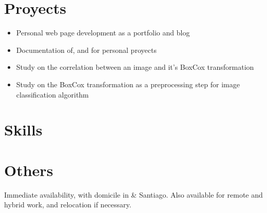 \documentclass{my_cv}
\begin{document}



\section{Proyects \faCogs}
\begin{itemize}
\item Personal web page development as a portfolio and blog
\item Documentation of, and for personal proyects
\end{itemize}

\begin{itemize}
\item Study on the correlation between an image and it's BoxCox transformation
\item Study on the BoxCox transformation as a preprocessing step for image classification algorithm
\end{itemize}

\section{Skills \faBullseye}


\section{Others \faPaperPlane}
Immediate availability, with domicile in {\valpo} \& Santiago. Also available for remote and hybrid work, and relocation if necessary.

\end{document}
